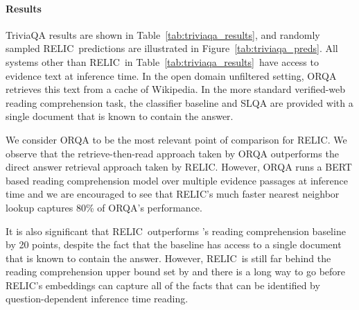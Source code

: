 \documentclass{article} \usepackage{iclr2020_conference,times}
\newcommand{\ack}{RELIC\xspace}
\begin{document}
\paragraph{Results}





TriviaQA results are shown in Table~\ref{tab:triviaqa_results}, and randomly sampled \ack~predictions are illustrated in Figure~\ref{tab:triviaqa_preds}.
All systems other than \ack~in Table~\ref{tab:triviaqa_results}~have access to evidence text at inference time.
In the open domain unfiltered setting, ORQA \citep{lee-etal-2019-latent} retrieves this text from a cache of Wikipedia. In the more standard verified-web reading comprehension task, the classifier baseline and SLQA are provided with a single document that is known to contain the answer. 

We consider ORQA to be the most relevant point of comparison for \ack. We observe that the retrieve-then-read approach taken by ORQA outperforms the direct answer retrieval approach taken by \ack.
However, ORQA runs a BERT based reading comprehension model over multiple evidence passages at inference time and we are encouraged to see that \ack's much faster nearest neighbor lookup captures 80\% of ORQA's performance.

It is also significant that \ack~outperforms \cite{joshi2017triviaqa}'s reading comprehension baseline by 20 points, despite the fact that the baseline has access to a single document that is known to contain the answer. However, \ack~is still far behind the reading comprehension upper bound set by \cite{wang2018multi} and there is a long way to go before \ack's embeddings can capture all of the facts that can be identified by question-dependent inference time reading.    
\end{document}
